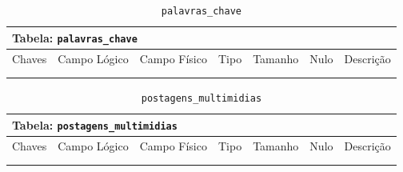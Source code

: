 \documentclass[12pt,a4paper]{article}
\begin{document}
\begin{center}
\begin{table}[h!]
	\caption{\texttt{palavras\_chave}}
	\label{tabela:palavrasChave}
	\begin{tabular}{|p{1cm}|p{1.5cm}|p{1.25cm}|p{1.25cm}|p{1.75cm}|p{1.25cm}|p{4.5cm}|}\hline	
		\multicolumn{7}{|p{16cm}|}{\cellcolor{cinzaClaro}  \centering Tabela: \texttt{palavras\_chave}} \\ \hline %
		{\small Chaves} & {\small Campo Lógico} & {\small Campo Físico} & {\small Tipo} & {\small Tamanho} & {\small Nulo} & {\small Descrição}\\\hline %
		
		{\tiny } & {\tiny } & {\tiny } & {\tiny } & {\tiny } & {\tiny } &{\tiny }\\\hline
		{\tiny } & {\tiny } & {\tiny } & {\tiny } & {\tiny } & {\tiny } &{\tiny }\\\hline
		
			
	\end{tabular}
\end{table}	
\end{center}

\begin{center}
\begin{table}[h!]
	\caption{\texttt{postagens\_multimidias}}
	\label{tabela:postagensMultimidias}
	\begin{tabular}{|p{1cm}|p{1.5cm}|p{1.25cm}|p{1.25cm}|p{1.75cm}|p{1.25cm}|p{4.5cm}|}\hline	
		\multicolumn{7}{|p{16cm}|}{\cellcolor{cinzaClaro}  \centering Tabela: \texttt{postagens\_multimidias}} \\ \hline %
		{\small Chaves} & {\small Campo Lógico} & {\small Campo Físico} & {\small Tipo} & {\small Tamanho} & {\small Nulo} & {\small Descrição}\\\hline %
		
		{\tiny } & {\tiny } & {\tiny } & {\tiny } & {\tiny } & {\tiny } &{\tiny }\\\hline
		{\tiny } & {\tiny } & {\tiny } & {\tiny } & {\tiny } & {\tiny } &{\tiny }\\\hline
		
			
	\end{tabular}
\end{table}	
\end{center}
\end{document}
